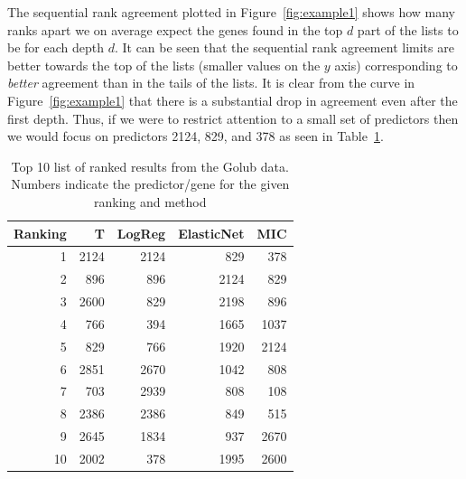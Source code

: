 \documentclass[12pt,a4paper]{article}
\theoremstyle{plain}
\begin{document}
The sequential rank agreement plotted in Figure~\ref{fig:example1}
shows how many ranks apart we on average expect the genes found in the
top $d$ part of the lists to be for each depth $d$.  It can be seen
that the sequential rank agreement limits are better towards the top
of the lists (smaller values on the $y$ axis) corresponding to
\emph{better} agreement than in the tails of the lists. It is clear
from the curve in Figure~\ref{fig:example1} that there is a
substantial drop in agreement even after the first depth. Thus, if we
were to restrict attention to a small set of predictors then we would
focus on predictors 2124, 829, and 378 as seen in Table~\ref{tab1}.













\begin{table}[tb]
\centering
\caption{Top 10 list of ranked results from the Golub data. Numbers indicate the predictor/gene for the given ranking and method} 
\label{tab1}
\begin{tabular}{rrrrr}
  \hline
Ranking & T & LogReg & ElasticNet & MIC \\ 
  \hline
1 & 2124 & 2124 & 829 & 378 \\ 
  2 & 896 & 896 & 2124 & 829 \\ 
  3 & 2600 & 829 & 2198 & 896 \\ 
  4 & 766 & 394 & 1665 & 1037 \\ 
  5 & 829 & 766 & 1920 & 2124 \\ 
  6 & 2851 & 2670 & 1042 & 808 \\ 
  7 & 703 & 2939 & 808 & 108 \\ 
  8 & 2386 & 2386 & 849 & 515 \\ 
  9 & 2645 & 1834 & 937 & 2670 \\ 
  10 & 2002 & 378 & 1995 & 2600 \\ 
   \hline
\end{tabular}
\end{table}
\end{document}
